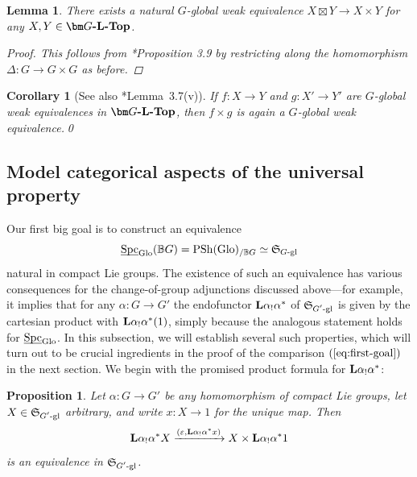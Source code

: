 \documentclass[reqno]{memo-l}
\theoremstyle{mythm}
\newtheorem{lemma}[thm]{Lemma}
\newtheorem{cor}[thm]{Corollary}
\newtheorem{prop}[thm]{Proposition}
\theoremstyle{definition}
\numberwithin{equation}{section}
\renewcommand{\epsilon}{\varepsilon}
\DeclareMathOperator{\Spc}{Spc}
\DeclareMathOperator{\PSh}{PSh}
\newcommand{\cat}[1]{\textbf{\textup{#1}}}
\newcommand{\Glo}{\textup{Glo}}
\newcommand{\BGcat}[1]{\mathbb B{#1}}
\newcommand{\ulhelper}[2]{\underline{\setbox0=\hbox{$#1#2$}\dp0=0.4pt \box0\relax}}
\newcommand{\ul}[1]{{\mathpalette\ulhelper{#1}}\hbox{\rule[-2pt]{0pt}{0pt}}}
\newcommand{\myS}{{{\mathfrak S\kern-.4pt}}}
\begin{document}
\begin{lemma}\label{lemma:box-product-vs-product}
    There exists a natural $G$-global weak equivalence $X\boxtimes Y\to X\times Y$ for any $X,Y\in\cat{$\bm G$-$\cat{L}$-Top}$.
    \begin{proof}
        This follows from \cite{barrero2021}*{Proposition 3.9} by restricting along the homomorphism $\Delta\colon G\to G\times G$ as before.
    \end{proof}
\end{lemma}

\begin{cor}[See also \cite{barrero2021}*{Lemma~3.7(v)}]\label{cor:cart-prod-homotopical}
    If $f\colon X\to Y$ and $g\colon X'\to Y'$ are $G$-global weak equivalences in $\cat{$\bm G$-$\cat{L}$-Top}$, then $f\times g$ is again a $G$-global weak equivalence.\qed
\end{cor}

\subsection{Model categorical aspects of the universal property}\label{subsec:model-cat-prereq}
Our first big goal is to construct an equivalence 
\begin{equation}\label{eq:first-goal}
    \ul\Spc_{\Glo}(\BGcat{G})=\PSh(\Glo)_{/\BGcat{G}}\simeq\myS_\text{$G$-gl}
\end{equation}    
natural in compact Lie groups. The existence of such an equivalence has various consequences for the change-of-group adjunctions discussed above---for example, it implies that for any $\alpha\colon G\to G'$ the endofunctor $\cat{L}\alpha_!\alpha^*$ of $\myS_\text{$G'$-gl}$ is given by the cartesian product with $\cat{L}\alpha_!\alpha^*(1)$, simply because the analogous statement holds for $\ul\Spc_\Glo$. In this subsection, we will establish several such properties, which will turn out to be crucial ingredients in the proof of the comparison $(\ref{eq:first-goal})$ in the next section. We begin with the promised product formula for $\cat{L}\alpha_!\alpha^*$:

\begin{prop}\label{prop:f!f*}
    Let $\alpha\colon G\to G'$ be any homomorphism of compact Lie groups, let $X\in\myS_\textup{$G'$-gl}$ arbitrary, and write $x\colon X\to 1$ for the unique map. Then 
    \[
        \cat{L}\alpha_!\alpha^*X\xrightarrow{(\epsilon,\cat{L}\alpha_!\alpha^*x)} X\times\cat{L}\alpha_!\alpha^*1
    \]
    is an equivalence in $\myS_\textup{$G'$-gl}$.
\end{prop}
\end{document}

